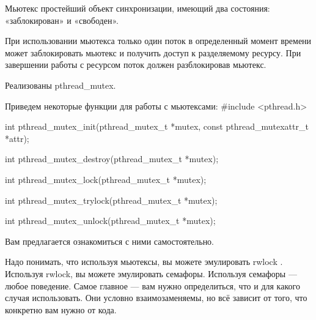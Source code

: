\begin{defi}{Мьютекс}
	простейший объект синхронизации, имеющий два состояния: «заблокирован» и «свободен».
\end{defi}

При использовании мьютекса только один поток в определенный момент времени может заблокировать мьютекс и получить доступ к разделяемому ресурсу. При завершении работы с ресурсом поток должен разблокировав мьютекс. 

Реализованы pthread\_mutex. 

\begin{CCode}{Приведем некоторые функции для работы с мьютексами:}
	#include <pthread.h>

	int pthread_mutex_init(pthread_mutex_t *mutex, 
            const pthread_mutexattr_t *attr);
	
	int pthread_mutex_destroy(pthread_mutex_t *mutex);

	int pthread_mutex_lock(pthread_mutex_t *mutex);

	int pthread_mutex_trylock(pthread_mutex_t *mutex);

	int pthread_mutex_unlock(pthread_mutex_t *mutex); \end{CCode}

Вам предлагается ознакомиться с ними самостоятельно.

Надо понимать, что используя мьютексы, вы можете эмулировать rwlock . Используя rwlock, вы можете эмулировать семафоры. Используя семафоры --- любое поведение. Самое главное --- вам нужно определиться, что и для какого случая использовать. Они условно взаимозаменяемы, но всё зависит от того, что конкретно вам нужно от кода.